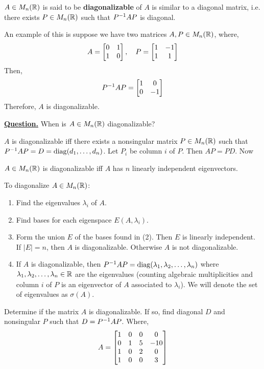 \begin{definition}
$A \in M_n(\mathbb{R})$ is said to be \textbf{diagonalizable} of $A$ is similar to a diagonal matrix, i.e. there exists $P \in M_n(\mathbb{R})$ such that $P^{-1} AP$ is diagonal.
\end{definition}

An example of this is suppose we have two matrices $A, P \in M_n(\mathbb{R})$, where,
$$A = \begin{bmatrix} 0 & 1 \\ 1 & 0 \end{bmatrix}, \quad P = \begin{bmatrix} 1 & -1 \\ 1 & 1 \end{bmatrix}$$
Then,
$$P^{-1} AP = \begin{bmatrix} 1 & 0 \\ 0 & -1 \end{bmatrix}$$
Therefore, $A$ is diagonalizable.

\ul{\textbf{Question.}} When is $A \in M_n(\mathbb{R})$ diagonalizable?

$A$ is diagonalizable iff there exists a nonsingular matrix $P \in M_n(\mathbb{R})$ such that $P^{-1} AP = D = \operatorname{diag}(d_1, \dots, d_n)$. Let $P_i$ be column $i$ of $P$. Then $AP = PD$. Now


\begin{theorem}
$A \in M_n(\mathbb{R})$ is diagonalizable iff $A$ has $n$ linearly independent eigenvectors.
\end{theorem}

\lline

To diagonalize $A \in M_n(\mathbb{R})$:
\begin{enumerate}
    \item Find the eigenvalues $\lambda_i$ of $A$.
    \item Find bases for each eigenspace $E(A, \lambda_i)$.
    \item Form the union $E$ of the bases found in (2). Then $E$ is linearly independent. If $|E| = n$, then $A$ is diagonalizable. Otherwise $A$ is not diagonalizable.
    \item If $A$ is diagonalizable, then $P^{-1} AP = \operatorname{diag}(\lambda_1, \lambda_2, \dots, \lambda_n)$ where $\lambda_1, \lambda_2, \dots, \lambda_n \in \mathbb{R}$ are the eigenvalues (counting algebraic multiplicities and column $i$ of $P$ is an eigenvector of $A$ associated to $\lambda_i$). We will denote the set of eigenvalues as $\sigma(A)$.
\end{enumerate}

\begin{example}
Determine if the matrix $A$ is diagonalizable. If so, find diagonal $D$ and nonsingular $P$ such that $D = P^{-1} AP$. Where,
$$A = \begin{bmatrix} 1 & 0 & 0 & 0 \\ 0 & 1 & 5 & -10 \\ 1 & 0 & 2 & 0 \\ 1 & 0 & 0 & 3 \end{bmatrix}$$
\end{example}

